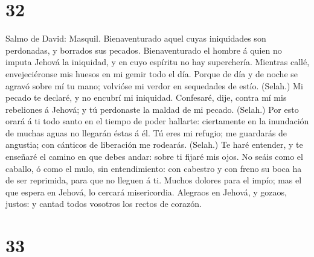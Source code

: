 \hypertarget{section-31}{%
\section{32}\label{section-31}}

 Salmo de David: Masquil. Bienaventurado aquel cuyas
iniquidades son perdonadas, y borrados sus pecados. 
Bienaventurado el hombre á quien no imputa Jehová la iniquidad, y en
cuyo espíritu no hay superchería.  Mientras callé,
envejeciéronse mis huesos en mi gemir todo el día.  Porque
de día y de noche se agravó sobre mí tu mano; volvióse mi verdor en
sequedades de estío. (Selah.)  Mi pecado te declaré, y no
encubrí mi iniquidad. Confesaré, dije, contra mí mis rebeliones á
Jehová; y tú perdonaste la maldad de mi pecado. (Selah.) 
Por esto orará á ti todo santo en el tiempo de poder hallarte:
ciertamente en la inundación de muchas aguas no llegarán éstas á él.
 Tú eres mi refugio; me guardarás de angustia; con
cánticos de liberación me rodearás. (Selah.)  Te haré
entender, y te enseñaré el camino en que debes andar: sobre ti fijaré
mis ojos.  No seáis como el caballo, ó como el mulo, sin
entendimiento: con cabestro y con freno su boca ha de ser reprimida,
para que no lleguen á ti.  Muchos dolores para el impío;
mas el que espera en Jehová, lo cercará misericordia. 
Alegraos en Jehová, y gozaos, justos: y cantad todos vosotros los rectos
de corazón.

\hypertarget{section-32}{%
\section{33}\label{section-32}}

